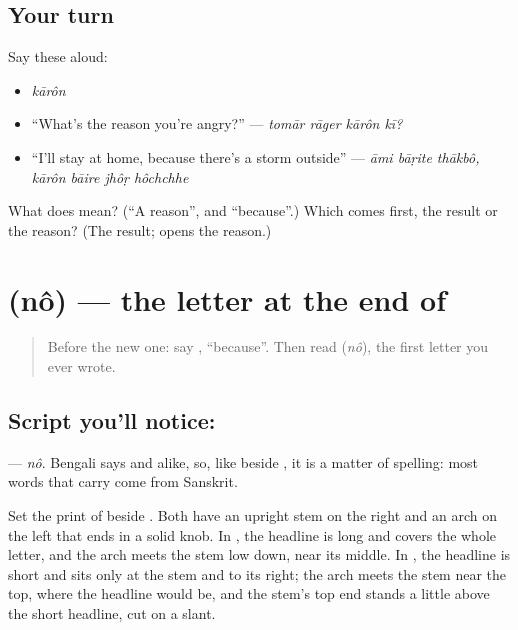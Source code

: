 \subsection*{Your turn}
Say these aloud:

\begin{itemize}
\raggedright
  \item \emph{kārôn}
  \item \textquotedblleft{}What's the reason you're angry?\textquotedblright{} — \emph{tomār rāger kārôn kī?}
  \item \textquotedblleft{}I'll stay at home, because there's a storm outside\textquotedblright{} — \emph{āmi bāṛite thākbô, kārôn bāire jhôṛ hôchchhe}
\end{itemize}

\begin{tcolorbox}[breakable,colback=teal!4,colframe=teal!35!black,title={Before you move on}]
What does \textbf{} mean? (\textquotedblleft{}A reason\textquotedblright{}, and \textquotedblleft{}because\textquotedblright{}.) Which comes first, the result or the reason? (The result; \textbf{} opens the reason.)
\end{tcolorbox}
\section[\texorpdfstring{\bn{ণ} (nô)}{ণ (nô)}]{ (nô) — the letter at the end of }

\label{lesson:BN-W268-letter-murdhanya-na}



\begin{quote}
Before the new one: say \textbf{}, \textquotedblleft{}because\textquotedblright{}. Then read \textbf{} (\emph{nô}), the first letter you ever wrote.
\end{quote}

\subsection*{Script you'll notice: }
\textbf{} — \emph{nô}. Bengali says \textbf{} and \textbf{} alike, so, like \textbf{} beside \textbf{}, it is a matter of spelling: most words that carry \textbf{} come from Sanskrit.

Set the print of \textbf{} beside \textbf{}. Both have an upright stem on the right and an arch on the left that ends in a solid knob. In \textbf{}, the headline is long and covers the whole letter, and the arch meets the stem low down, near its middle. In \textbf{}, the headline is short and sits only at the stem and to its right; the arch meets the stem near the top, where the headline would be, and the stem's top end stands a little above the short headline, cut on a slant.

